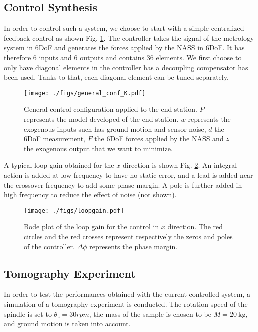 \documentclass[a4paper, keeplastbox, biblatex]{jacow}
\begin{document}
\subsection{Control Synthesis}
\label{sec:org253eb42}
In order to control such a system, we choose to start with a simple centralized feedback control as shown Fig. \ref{fig:general_conf_K}.
The controller takes the signal of the metrology system in 6DoF and generates the forces applied by the NASS in 6DoF. It has therefore 6 inputs and 6 outputs and contains 36 elements.
We first choose to only have diagonal elements in the controller has a decoupling compensator has been used.
Tanks to that, each diagonal element can be tuned separately.

\begin{figure}[htbp]
\centering
\texttt{[image: ./figs/general\_conf\_K.pdf]}
\caption{\label{fig:general_conf_K}
General control configuration applied to the end station. \(P\) represents the model developed of the end station. \(w\) represents the exogenous inputs such has ground motion and sensor noise, \(d\) the 6DoF measurement, \(F\) the 6DoF forces applied by the NASS and \(z\) the exogenous output that we want to minimize.}
\end{figure}

A typical loop gain obtained for the \(x\) direction is shown Fig. \ref{fig:loopgain}. An integral action is added at low frequency to have no static error, and a lead is added near the crossover frequency to add some phase margin. A pole is further added in high frequency to reduce the effect of noise (not shown).

\begin{figure}[htbp]
\centering
\texttt{[image: ./figs/loopgain.pdf]}
\caption{\label{fig:loopgain}
Bode plot of the loop gain for the control in \(x\) direction. The red circles and the red crosses represent respectively the zeros and poles of the controller. \(\Delta\phi\) represents the phase margin.}
\end{figure}

\subsection{Tomography Experiment}
\label{sec:org05ae606}
In order to test the performances obtained with the current controlled system, a simulation of a tomography experiment is conducted.
The rotation speed of the spindle is set to \(\dot{\theta_z} = 30rpm\), the mass of the sample is chosen to be \(M=\SI{20}{\kilo\gram}\), and ground motion is taken into account.
\end{document}
